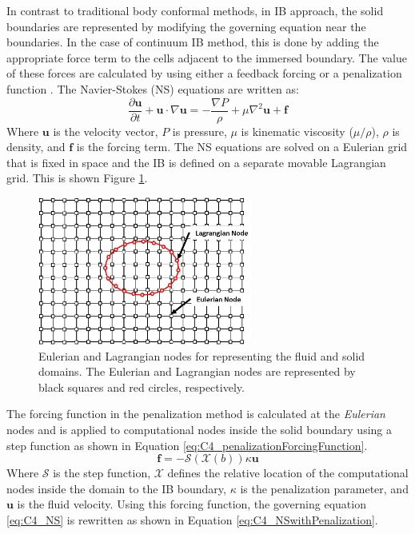 In contrast to traditional body conformal methods, in IB approach, the solid boundaries are represented by modifying the governing equation near the boundaries. In the case of continuum IB method, this is done by adding the appropriate force term to the cells adjacent to the immersed boundary. The value of these forces are calculated by using either a feedback forcing \cite{goldstein1993modeling} or a penalization function \cite{arquis1984conditions}. The Navier-Stokes (NS) equations are written as:
%
\begin{equation}\label{eq:C4_NS}
    \frac{\partial \mathbf{u}}{\partial t} + \mathbf{u} \cdot \nabla \mathbf{u} = 
    -\frac{\nabla P}{\rho} + \mu \nabla^2 \mathbf{u} + \mathbf{f}
\end{equation}
%
Where $\mathbf{u}$ is the velocity vector, $P$ is pressure, $\mu$ is kinematic viscosity ($\mu / \rho$), $\rho$ is density, and $\mathbf{f}$ is the forcing term. The NS equations are solved on a Eulerian grid that is fixed in space and the IB is defined on a separate movable Lagrangian grid. This is shown Figure \ref{fig:C4_lagrangianAndEulerianDomain}.
%
\begin{figure}[H]
    \centering
    \includegraphics[width=7.00cm]{Chapter_4/figure/lagrangian_and_eulerian_nodes.jpg}
    \caption{Eulerian and Lagrangian nodes for representing the fluid and solid domains. The Eulerian and Lagrangian nodes are represented by black squares and red circles, respectively.}
    \label{fig:C4_lagrangianAndEulerianDomain}
\end{figure}
%
The forcing function in the penalization method is calculated at the \emph{Eulerian} nodes and is applied to computational nodes inside the solid boundary using a step function as shown in Equation \eqref{eq:C4_penalizationForcingFunction}.
%
\begin{equation}\label{eq:C4_penalizationForcingFunction}
    \mathbf{f} = -\mathcal{S}(\mathcal{X}(b)) \kappa \mathbf{u}
\end{equation}
%
Where $\mathcal{S}$ is the step function, $\mathcal{X}$ defines the relative location of the computational nodes inside the domain to the IB boundary, $\kappa$ is the penalization parameter, and $\mathbf{u}$ is the fluid velocity. Using this forcing function, the governing equation \eqref{eq:C4_NS} is rewritten as shown in Equation \eqref{eq:C4_NSwithPenalization}.
